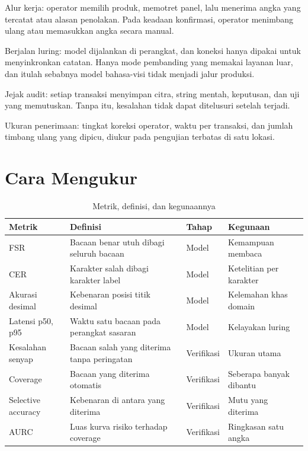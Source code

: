 \documentclass[12pt,a4paper,oneside]{report}
\begin{document}
\begin{poin}
  \item Alur kerja: operator memilih produk, memotret panel, lalu menerima angka
        yang tercatat atau alasan penolakan. Pada keadaan konfirmasi, operator
        menimbang ulang atau memasukkan angka secara manual.
  \item Berjalan luring: model dijalankan di perangkat, dan koneksi hanya dipakai
        untuk menyinkronkan catatan. Hanya mode pembanding yang memakai layanan
        luar, dan itulah sebabnya model bahasa-visi tidak menjadi jalur produksi.
  \item Jejak audit: setiap transaksi menyimpan citra, string mentah, keputusan,
        dan uji yang memutuskan. Tanpa itu, kesalahan tidak dapat ditelusuri
        setelah terjadi.
  \item Ukuran penerimaan: tingkat koreksi operator, waktu per transaksi, dan
        jumlah timbang ulang yang dipicu, diukur pada pengujian terbatas di satu
        lokasi.
\end{poin}

\section{Cara Mengukur}

\begin{table}[H]
\caption{Metrik, definisi, dan kegunaannya}
\label{tab:metrik}
\begin{tabularx}{\textwidth}{@{}L{2.7cm} L{5.4cm} L{2.2cm} X@{}}
\toprule
\textbf{Metrik} & \textbf{Definisi} & \textbf{Tahap} & \textbf{Kegunaan} \\
\midrule
FSR & Bacaan benar utuh dibagi seluruh bacaan & Model & Kemampuan membaca \\
CER & Karakter salah dibagi karakter label & Model & Ketelitian per karakter \\
Akurasi desimal & Kebenaran posisi titik desimal & Model & Kelemahan khas domain \\
Latensi p50, p95 & Waktu satu bacaan pada perangkat sasaran & Model & Kelayakan luring \\
Kesalahan senyap & Bacaan salah yang diterima tanpa peringatan & Verifikasi & Ukuran utama \\
Coverage & Bacaan yang diterima otomatis & Verifikasi & Seberapa banyak dibantu \\
Selective accuracy & Kebenaran di antara yang diterima & Verifikasi & Mutu yang diterima \\
AURC & Luas kurva risiko terhadap coverage & Verifikasi & Ringkasan satu angka \\
\bottomrule
\end{tabularx}
\end{table}
\end{document}
